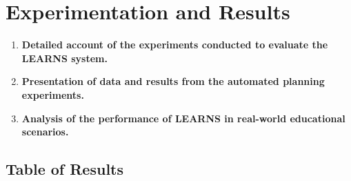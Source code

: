\section{Experimentation and Results}
\begin{enumerate}
    \item \textbf{Detailed account of the experiments conducted to evaluate the LEARNS system.}
    \item \textbf{Presentation of data and results from the automated planning experiments.}
    \item \textbf{Analysis of the performance of LEARNS in real-world educational scenarios.}
\end{enumerate}

\subsection{Table of Results}

